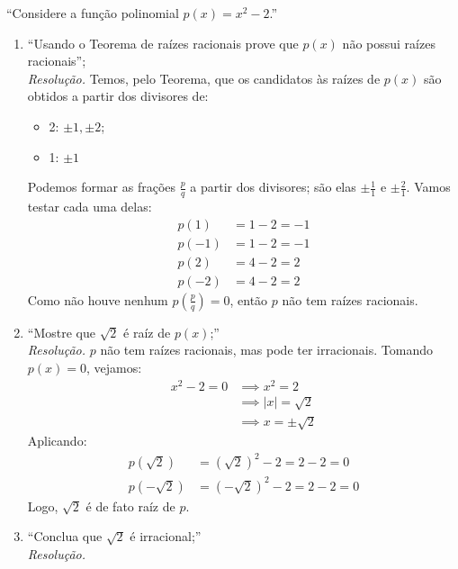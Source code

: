 \enquote{Considere a função polinomial $p(x) = x^2 - 2$.}
\begin{enumerate}
    \item \enquote{Usando o Teorema de raízes racionais prove que $p(x)$ não
    possui raízes racionais}; \\
    \emph{Resolução.} Temos, pelo Teorema, que os candidatos às raízes de $p(x)$ são obtidos a partir dos divisores de:
    \begin{itemize}
        \item 2: $\pm 1, \pm 2$;
        \item 1: $\pm 1$
    \end{itemize}
    Podemos formar as frações $\frac{p}{q}$ a partir dos divisores; são elas $\pm \frac{1}{1}$ e $\pm \frac{2}{1}$. Vamos testar cada uma delas:
    \begin{align*}
        p(1) &= 1 - 2 = -1 \\
        p(-1) &= 1 - 2 = -1 \\
        p(2) &= 4 - 2 = 2 \\
        p(-2) &= 4 - 2 = 2
    \end{align*}
    Como não houve nenhum $p(\frac{p}{q}) = 0$, então $p$ não tem raízes racionais.
    \item \enquote{Mostre que $\sqrt{2}$ é raíz de $p(x)$;} \\
    \emph{Resolução.} $p$ não tem raízes racionais, mas pode ter irracionais. Tomando $p(x) = 0$, vejamos:
    \begin{align*}
        x^2 - 2 = 0 & \implies x^2 = 2 \\ & \implies
        |x| = \sqrt{2} \\ & \implies
        x = \pm \sqrt{2}
    \end{align*}
    Aplicando:
    \begin{align*}
        p(\sqrt{2}) &= (\sqrt{2})^2 - 2 = 2 - 2 = 0 \\
        p(-\sqrt{2}) &= (-\sqrt{2})^2 - 2 = 2 - 2 = 0
    \end{align*}
    Logo, $\sqrt{2}$ é de fato raíz de $p$.
    \item \enquote{Conclua que $\sqrt{2}$ é irracional;} \\
    \emph{Resolução.}
\end{enumerate}